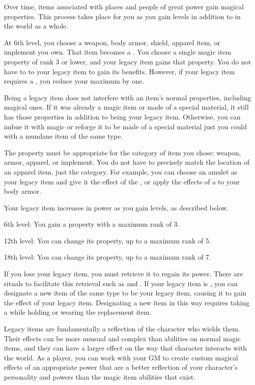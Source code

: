     Over time, items associated with places and people of great power gain magical properties.
    This process takes place for you as you gain levels in addition to in the world as a whole.

    At 6th level, you choose a weapon, body armor, shield, apparel item, or implement you own.
    That item becomes a .
    You choose a single magic item property of rank 3 or lower, and your legacy item gains that property.
    You do not have to  to your legacy item to gain its benefits.
    However, if your legacy item requires a , you reduce your maximum  by one.

    Being a legacy item does not interfere with an item's normal properties, including magical ones.
    If it was already a magic item or made of a special material, it still has those properties in addition to being your legacy item.
    Otherwise, you can imbue it with magic or reforge it to be made of a special material just you could with a mundane item of the same type.

    The property must be appropriate for the category of item you chose: weapon, armor, apparel, or implement.
    You do not have to precisely match the location of an apparel item, just the category.
    For example, you can choose an amulet as your legacy item and give it the effect of the , or apply the effects of a  to your body armor.

    Your legacy item increases in power as you gain levels, as described below.
    \begin{raggeditemize}
      \item 6th level: You gain a property with a maximum rank of 3.
      \item 12th level: You can change its property, up to a maximum rank of 5.
      \item 18th level: You can change its property, up to a maximum rank of 7.
    \end{raggeditemize}

    If you lose your legacy item, you must retrieve it to regain its power.
    There are rituals to facilitate this retrieval such as  and .
    If your legacy item is , you can designate a new item of the same type to be your legacy item, causing it to gain the effect of your legacy item.
    Designating a new item in this way requires taking a  while holding or wearing the replacement item.

    Legacy items are fundamentally a reflection of the character who wields them.
    Their effects can be more unusual and complex than abilities on normal magic items, and they can have a larger effect on the way that character interacts with the world.
    As a player, you can work with your GM to create custom magical effects of an appropriate power that are a better reflection of your character's personality and powers than the magic item abilities that exist.
